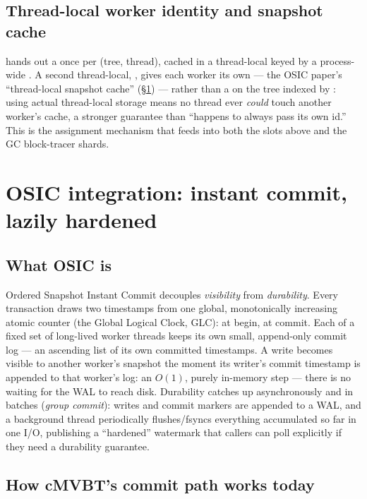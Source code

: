 \documentclass[11pt]{article}
\begin{document}
\subsection{Thread-local worker identity and snapshot cache}

 hands out a  once per (tree, thread),
cached in a thread-local keyed by a process-wide . A second thread-local,
, gives each worker its own  --- the OSIC
paper's ``thread-local snapshot cache'' (\S\ref{sec:osic}) --- rather than a
 on the tree indexed by : using actual thread-local storage
means no thread ever \emph{could} touch another worker's cache, a stronger guarantee than
``happens to always pass its own id.'' This is the assignment mechanism that feeds
 into both the  slots above and the GC block-tracer
shards.

\section{OSIC integration: instant commit, lazily hardened}
\label{sec:osic}

\subsection{What OSIC is}

Ordered Snapshot Instant Commit \cite{alhomssi2023scalable} decouples \emph{visibility}
from \emph{durability}. Every transaction draws two timestamps from one global,
monotonically increasing atomic counter (the Global Logical Clock, GLC): 
at begin,  at commit. Each of a fixed set of long-lived worker threads
keeps its own small, append-only commit log --- an ascending list of its own committed
timestamps. A write becomes visible to another worker's snapshot the moment its writer's
commit timestamp is appended to that worker's log: an $O(1)$, purely in-memory step ---
there is no waiting for the WAL to reach disk. Durability catches up asynchronously and
in batches (\emph{group commit}): writes and commit markers are appended to a WAL, and a
background thread periodically flushes/fsyncs everything accumulated so far in one I/O,
publishing a ``hardened'' watermark that callers can poll explicitly if they need a
durability guarantee.

\subsection{How cMVBT's commit path works today}
\end{document}
